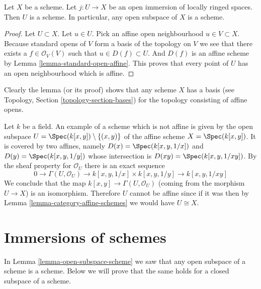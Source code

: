 \begin{lemma}
\label{lemma-open-subspace-scheme}
Let $X$ be a scheme. Let $j : U \to X$ be an open immersion
of locally ringed spaces. Then $U$ is a scheme. In particular,
any open subspace of $X$ is a scheme.
\end{lemma}

\begin{proof}
Let $U \subset X$. Let $u \in U$.
Pick an affine open neighbourhood $u \in V \subset X$.
Because standard opens of $V$ form a basis of the topology
on $V$ we see that there exists a $f\in \mathcal{O}_V(V)$
such that $u \in D(f) \subset U$. And $D(f)$ is an affine scheme
by Lemma \ref{lemma-standard-open-affine}. This proves that every point
of $U$ has an open neighbourhood which is affine.
\end{proof}

\noindent
Clearly the lemma (or its proof) shows that any scheme
$X$ has a basis (see Topology, Section \ref{topology-section-bases})
for the topology consisting of affine opens.

\begin{example}
\label{example-not-affine}
Let $k$ be a field.
An example of a scheme which is not affine is
given by the open subspace
$U = \Spec(k[x, y]) \setminus \{ (x, y)\}$
of the affine scheme $X =\Spec(k[x, y])$.
It is covered by two affines, namely $D(x) = \Spec(k[x, y, 1/x])$
and $D(y) = \Spec(k[x, y, 1/y])$ whose intersection is
$D(xy) = \Spec(k[x, y, 1/xy])$. By the sheaf property
for $\mathcal{O}_U$ there is an exact sequence
$$
0 \to
\Gamma(U, \mathcal{O}_U) \to
k[x, y, 1/x] \times k[x, y, 1/y] \to
k[x, y, 1/xy]
$$
We conclude that the map $k[x, y] \to \Gamma(U, \mathcal{O}_U)$
(coming from the morphism $U \to X$) is an isomorphism.
Therefore $U$ cannot be affine since if it was then by
Lemma \ref{lemma-category-affine-schemes} we would have $U \cong X$.
\end{example}











\section{Immersions of schemes}
\label{section-immersions}

\noindent
In Lemma \ref{lemma-open-subspace-scheme} we saw that any open subspace
of a scheme is a scheme. Below we will prove that the same holds for
a closed subspace of a scheme.

